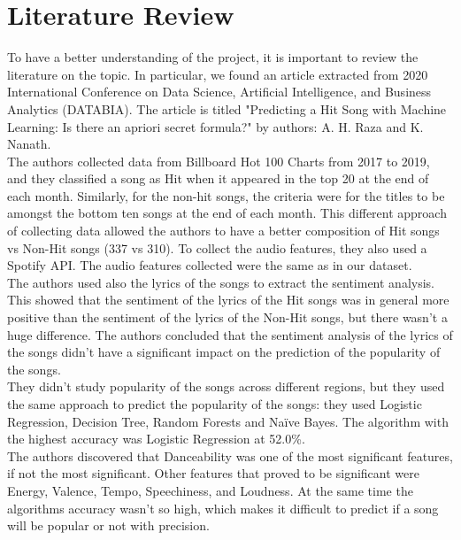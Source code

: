\chapter{Literature Review}

To have a better understanding of the project, it is important to review the literature on the topic. In particular, we found an article extracted from 2020 International Conference on Data Science, Artificial Intelligence, and Business Analytics (DATABIA). The article is titled "Predicting a Hit Song with Machine Learning: Is there an apriori secret formula?" by authors: A. H. Raza and K. Nanath. \\
The authors collected data from Billboard Hot 100 Charts from 2017 to 2019, and they classified a song as Hit when it appeared in the top 20 at the end of each month. Similarly, for the non-hit songs, the criteria were for the titles to be amongst the bottom ten songs at the end of each month.
This different approach of collecting data allowed the authors to have a better composition of Hit songs vs Non-Hit songs (337 vs 310). To collect the audio features, they also used a Spotify API. The audio features collected were the same as in our dataset. \\
The authors used also the lyrics of the songs to extract the sentiment analysis. This showed that the sentiment of the lyrics of the Hit songs was in general more positive than the sentiment of the lyrics of the Non-Hit songs, but there wasn't a huge difference. The authors concluded that the sentiment analysis of the lyrics of the songs didn't have a significant impact on the prediction of the popularity of the songs. \\
They didn't study popularity of the songs across different regions, but they used the same approach to predict the popularity of the songs: they used Logistic Regression, Decision Tree, Random Forests and Naïve Bayes.
The algorithm with the highest accuracy was Logistic Regression at 52.0\%. \\
The authors discovered that Danceability was one of the most significant features, if not the most significant. Other features that proved to be significant were Energy, Valence, Tempo, Speechiness, and Loudness. At the same time the algorithms accuracy wasn't so high, which makes it difficult to predict if a song will be popular or not with precision. \\
